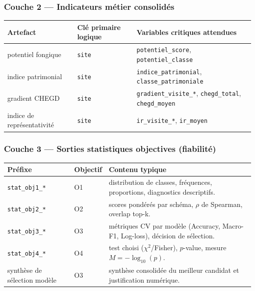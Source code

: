 \documentclass[11pt,a4paper]{article}
\begin{document}
\subsubsection{Couche 2 --- Indicateurs métier consolidés}
\begin{center}\begin{tabular}{p{}p{}p{}}
\toprule
\textbf{Artefact} & \textbf{Clé primaire logique} & \textbf{Variables critiques attendues} \\
\midrule
potentiel fongique & \texttt{site} & \texttt{potentiel\_score}, \texttt{potentiel\_classe} \\
indice patrimonial & \texttt{site} & \texttt{indice\_patrimonial}, \texttt{classe\_patrimoniale} \\
gradient CHEGD & \texttt{site} & \texttt{gradient\_visite\_*}, \texttt{chegd\_total}, \texttt{chegd\_moyen} \\
indice de représentativité & \texttt{site} & \texttt{ir\_visite\_*}, \texttt{ir\_moyen} \\
\bottomrule
\end{tabular}\end{center}

\subsubsection{Couche 3 --- Sorties statistiques objectives (fiabilité)}
\begin{center}\begin{tabular}{p{}p{}p{}}
\toprule
\textbf{Préfixe} & \textbf{Objectif} & \textbf{Contenu typique} \\
\midrule
\texttt{stat\_obj1\_*} & O1 & distribution de classes, fréquences, proportions, diagnostics descriptifs. \\
\texttt{stat\_obj2\_*} & O2 & scores pondérés par schéma, $\rho$ de Spearman, overlap top-k. \\
\texttt{stat\_obj3\_*} & O3 & métriques CV par modèle (Accuracy, Macro-F1, Log-loss), décision de sélection. \\
\texttt{stat\_obj4\_*} & O4 & test choisi ($\chi^2$/Fisher), $p$-value, mesure $M=-\log_{10}(p)$. \\
synthèse de sélection modèle & O3 & synthèse consolidée du meilleur candidat et justification numérique. \\
\bottomrule
\end{tabular}\end{center}
\end{document}
